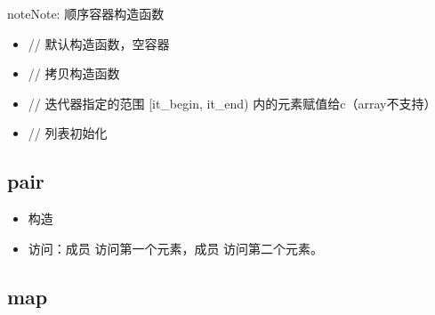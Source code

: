 \documentclass[letterpaper,10pt,english]{sphinxmanual}
\begin{document}
\begin{sphinxadmonition}{note}{Note:}
顺序容器构造函数
\begin{itemize}
\item {} 
 // 默认构造函数，空容器

\item {} 
 // 拷贝构造函数

\item {} 
 // 迭代器指定的范围 {[}it\_begin, it\_end) 内的元素赋值给c（array不支持）

\item {} 
 // 列表初始化

\end{itemize}
\end{sphinxadmonition}


\subsection{pair}
\label{\detokenize{cpp/19_stl:pair}}
%
\begin{sphinxVerbatim}[commandchars=\\\{\}]
\end{sphinxVerbatim}
\begin{itemize}
\item {} 
构造

%
\begin{sphinxVerbatim}[commandchars=\\\{\}]
    
     
\end{sphinxVerbatim}

\item {} 
访问：成员  访问第一个元素，成员  访问第二个元素。

\end{itemize}


\subsection{map}
\label{\detokenize{cpp/19_stl:map}}
%
\begin{sphinxVerbatim}[commandchars=\\\{\}]
\end{sphinxVerbatim}
\end{document}
